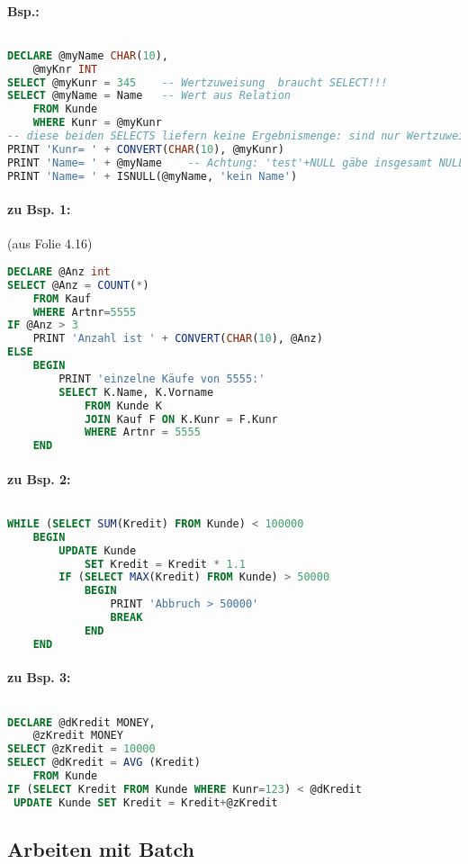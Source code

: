 \paragraph{Bsp.:}$ $
\begin{lstlisting}[language=SQL]
DECLARE @myName CHAR(10),
	@myKnr INT
SELECT @myKunr = 345	-- Wertzuweisung  braucht SELECT!!!
SELECT @myName = Name	-- Wert aus Relation
	FROM Kunde
	WHERE Kunr = @myKunr
-- diese beiden SELECTS liefern keine Ergebnismenge: sind nur Wertzuweisungen
PRINT 'Kunr= ' + CONVERT(CHAR(10), @myKunr)
PRINT 'Name= ' + @myName	-- Achtung: 'test'+NULL gäbe insgesamt NULL, also keine Ausgabe, Lösung:
PRINT 'Name= ' + ISNULL(@myName, 'kein Name')
\end{lstlisting}
\paragraph{zu Bsp. 1:} (aus Folie 4.16)
\begin{lstlisting}[language=SQL]
DECLARE @Anz int
SELECT @Anz = COUNT(*)
	FROM Kauf
	WHERE Artnr=5555
IF @Anz > 3
	PRINT 'Anzahl ist ' + CONVERT(CHAR(10), @Anz)
ELSE
	BEGIN
		PRINT 'einzelne Käufe von 5555:'
		SELECT K.Name, K.Vorname
			FROM Kunde K
			JOIN Kauf F ON K.Kunr = F.Kunr
			WHERE Artnr = 5555
	END
\end{lstlisting}
\paragraph{zu Bsp. 2:}$ $
\begin{lstlisting}[language=SQL]
WHILE (SELECT SUM(Kredit) FROM Kunde) < 100000
	BEGIN
		UPDATE Kunde
			SET Kredit = Kredit * 1.1
		IF (SELECT MAX(Kredit) FROM Kunde) > 50000
			BEGIN
				PRINT 'Abbruch > 50000'
				BREAK
			END
	END
\end{lstlisting}
\paragraph{zu Bsp. 3:}$ $
\begin{lstlisting}[language=SQL]
DECLARE @dKredit MONEY,
	@zKredit MONEY
SELECT @zKredit = 10000
SELECT @dKredit = AVG (Kredit)
	FROM Kunde
IF (SELECT Kredit FROM Kunde WHERE Kunr=123) < @dKredit
 UPDATE Kunde SET Kredit = Kredit+@zKredit
\end{lstlisting}

\subsection{Arbeiten mit Batch}
